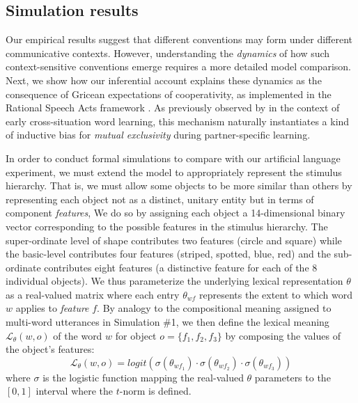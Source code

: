 \subsection{Simulation results}

Our empirical results suggest that different conventions may form under different communicative contexts.
However, understanding the \emph{dynamics} of how such context-sensitive conventions emerge requires a more detailed model comparison.
Next, we show how our inferential account explains these dynamics as the consequence of Gricean expectations of cooperativity, as implemented in the Rational Speech Acts framework \cite{GoodmanFrank16_RSATiCS,FrankeJager16_ProbabilisticPragmatics}.
As previously observed by \cite{FrankGoodmanTenenbaum09_Wurwur} in the context of early cross-situation word learning, this mechanism naturally instantiates a kind of inductive bias for \emph{mutual exclusivity} during partner-specific learning.

In order to conduct formal simulations to compare with our artificial language experiment, we must extend the model to appropriately represent the stimulus hierarchy. 
That is, we must allow some objects to be more similar than others by representing each object not as a distinct, unitary entity but in terms of component \emph{features}, 
We do so by assigning each object a 14-dimensional binary vector corresponding to the possible features in the stimulus hierarchy.
The super-ordinate level of shape contributes two features (circle and square) while the basic-level contributes four features (striped, spotted, blue, red) and the sub-ordinate contributes eight features (a distinctive feature for each of the 8 individual objects). 
We thus parameterize the underlying lexical representation $\theta$ as a real-valued matrix where each entry $\theta_{wf}$ represents the extent to which word $w$ applies to \emph{feature} $f$.
By analogy to the compositional meaning assigned to multi-word utterances in Simulation \#1, we then define the lexical meaning $\mathcal{L}_\theta(w,o)$ of the word $w$ for object $o = \{f_1, f_2, f_3\}$ by composing the values of the object's features: 
$$\mathcal{L}_\theta(w,o) = logit(\sigma(\theta_{wf_1}) \cdot \sigma(\theta_{wf_2}) \cdot \sigma(\theta_{wf_3}))$$
where $\sigma$ is the logistic function mapping the real-valued $\theta$ parameters to the $[0,1]$ interval where the $t$-norm is defined.

